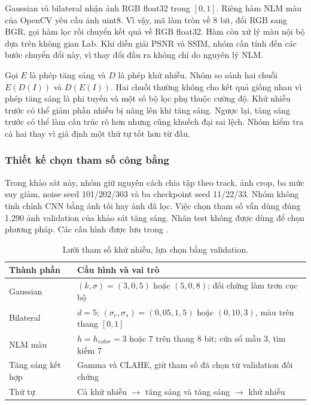 Gaussian và bilateral nhận ảnh RGB float32 trong $[0,1]$. Riêng hàm NLM màu của OpenCV yêu cầu ảnh uint8. Vì vậy, mã làm tròn về 8 bit, đổi RGB sang BGR, gọi hàm lọc rồi chuyển kết quả về RGB float32. Hàm còn xử lý màu nội bộ dựa trên không gian Lab. Khi diễn giải PSNR và SSIM, nhóm cần tính đến các bước chuyển đổi này, vì thay đổi đầu ra không chỉ do nguyên lý NLM.

Gọi $E$ là phép tăng sáng và $D$ là phép khử nhiễu. Nhóm so sánh hai chuỗi $E(D(I))$ và $D(E(I))$. Hai chuỗi thường không cho kết quả giống nhau vì phép tăng sáng là phi tuyến và một số bộ lọc phụ thuộc cường độ. Khử nhiễu trước có thể giảm phần nhiễu bị nâng lên khi tăng sáng. Ngược lại, tăng sáng trước có thể làm cấu trúc rõ hơn nhưng cũng khuếch đại sai lệch. Nhóm kiểm tra cả hai thay vì giả định một thứ tự tốt hơn từ đầu.

\subsubsection{Thiết kế chọn tham số công bằng}
Trong khảo sát này, nhóm giữ nguyên cách chia tập theo track, ảnh crop, ba mức suy giảm, noise seed 101/202/303 và ba checkpoint seed 11/22/33. Nhóm không tinh chỉnh CNN bằng ảnh tối hay ảnh đã lọc. Việc chọn tham số vẫn dùng đúng 1.290 ảnh validation của khảo sát tăng sáng. Nhãn test không được dùng để chọn phương pháp. Các cấu hình được lưu trong .

\par
\begin{table}[!htbp]
\centering\small
\caption{Lưới tham số khử nhiễu, lựa chọn bằng validation.}
\begin{tabular}{P{3.0cm}P{10.5cm}}
\toprule
Thành phần & Cấu hình và vai trò \\
\midrule
Gaussian & $(k,\sigma)=(3,0{,}5)$ hoặc $(5,0{,}8)$; đối chứng làm trơn cục bộ \\
Bilateral & $d=5$; $(\sigma_c,\sigma_s)=(0{,}05,1{,}5)$ hoặc $(0{,}10,3)$, màu trên thang $[0,1]$ \\
NLM màu & $h=h_{color}=3$ hoặc $7$ trên thang 8 bit; cửa sổ mẫu 3, tìm kiếm 7 \\
Tăng sáng kết hợp & Gamma và CLAHE, giữ tham số đã chọn từ validation đối chứng \\
Thứ tự & Cả khử nhiễu $\to$ tăng sáng và tăng sáng $\to$ khử nhiễu \\
\bottomrule
\end{tabular}
\end{table}\par


